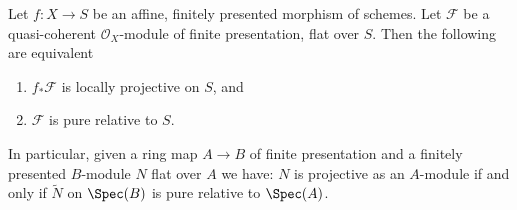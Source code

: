 \begin{proposition}
\label{proposition-finite-presentation-flat-pure-is-projective}
Let $f : X \to S$ be an affine, finitely presented morphism of schemes.
Let $\mathcal{F}$ be a quasi-coherent $\mathcal{O}_X$-module of
finite presentation, flat over $S$. Then the following
are equivalent
\begin{enumerate}
\item $f_*\mathcal{F}$ is locally projective on $S$, and
\item $\mathcal{F}$ is pure relative to $S$.
\end{enumerate}
In particular, given a ring map $A \to B$ of finite presentation and
a finitely presented $B$-module $N$ flat over $A$ we have:
$N$ is projective as an $A$-module if and only if $\widetilde{N}$
on $\Spec(B)$ is pure relative to $\Spec(A)$.
\end{proposition}

